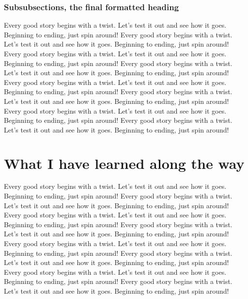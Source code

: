 \subsubsection{Subsubsections, the final formatted heading}

Every good story begins with a twist. Let's test it out and see how it goes. Beginning to ending, just spin around! Every good story begins with a twist. Let's test it out and see how it goes. Beginning to ending, just spin around! Every good story begins with a twist. Let's test it out and see how it goes. Beginning to ending, just spin around! Every good story begins with a twist. Let's test it out and see how it goes. Beginning to ending, just spin around! Every good story begins with a twist. Let's test it out and see how it goes. Beginning to ending, just spin around! Every good story begins with a twist. Let's test it out and see how it goes. Beginning to ending, just spin around! Every good story begins with a twist. Let's test it out and see how it goes. Beginning to ending, just spin around! Every good story begins with a twist. Let's test it out and see how it goes. Beginning to ending, just spin around!

\section{What I have learned along the way}

Every good story begins with a twist. Let's test it out and see how it goes. Beginning to ending, just spin around! Every good story begins with a twist. Let's test it out and see how it goes. Beginning to ending, just spin around! Every good story begins with a twist. Let's test it out and see how it goes. Beginning to ending, just spin around! Every good story begins with a twist. Let's test it out and see how it goes. Beginning to ending, just spin around! Every good story begins with a twist. Let's test it out and see how it goes. Beginning to ending, just spin around! Every good story begins with a twist. Let's test it out and see how it goes. Beginning to ending, just spin around! Every good story begins with a twist. Let's test it out and see how it goes. Beginning to ending, just spin around! Every good story begins with a twist. Let's test it out and see how it goes. Beginning to ending, just spin around!